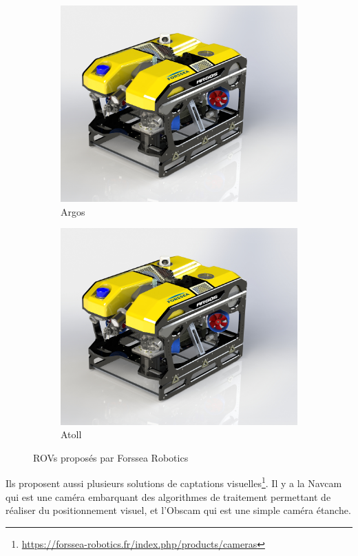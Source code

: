     \begin{figure}
        \centering
        \begin{subfigure}[b]{0.45\textwidth}
            \centering
            \includegraphics[width=\textwidth]{imgs/Argos.jpg}
            \caption{\gls{Argos}}
        \end{subfigure}
        \hfill
        \begin{subfigure}[b]{0.45\textwidth}
            \centering
            \includegraphics[width=\textwidth]{imgs/Argos.jpg}
            \caption{\gls{Atoll}}
        \end{subfigure}
        \caption{\gls{ROV}s proposés par Forssea Robotics}
    \end{figure}

    Ils proposent aussi plusieurs solutions de captations visuelles\footnote{\url{https://forssea-robotics.fr/index.php/products/cameras}}. Il y a la \gls{Navcam} qui est une caméra embarquant des algorithmes de traitement permettant de réaliser du positionnement visuel, et l'\gls{Obscam} qui est une simple caméra étanche.